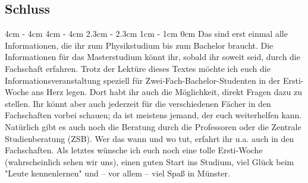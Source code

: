 \begin{multicols*}{2}
\subsection*{\hspace{2.5cm}Schluss}
4cm \dimexpr\columnwidth - 4cm
4cm \dimexpr\columnwidth - 4cm
2.3cm \dimexpr\columnwidth - 2.3cm
1cm \dimexpr\columnwidth - 1cm
0cm \columnwidth
Das sind erst einmal alle Informationen, die ihr zum Physikstudium bis zum Bachelor braucht. Die Informationen für das Masterstudium könnt ihr, sobald ihr soweit seid, durch die Fachschaft erfahren. Trotz der Lektüre dieses Textes möchte ich euch die Informationsveranstaltung speziell für Zwei-Fach-Bachelor-Studenten in der Ersti-Woche ans Herz legen. Dort habt ihr auch die Möglichkeit, direkt Fragen dazu zu stellen. Ihr könnt aber auch jederzeit für die verschiedenen Fächer in den Fachschaften vorbei schauen; da ist meistens jemand, der euch weiterhelfen kann. Natürlich gibt es auch noch die Beratung durch die Professoren oder die Zentrale Studienberatung (ZSB). Wer das wann und wo tut, erfahrt ihr u.a. auch in den Fachschaften. Als letztes wünsche ich euch noch eine tolle Ersti-Woche (wahrscheinlich sehen wir uns), einen guten Start ins Studium, viel Glück beim "Leute kennenlernen" und -- vor allem -- viel Spaß in Münster.

\end{multicols*}
